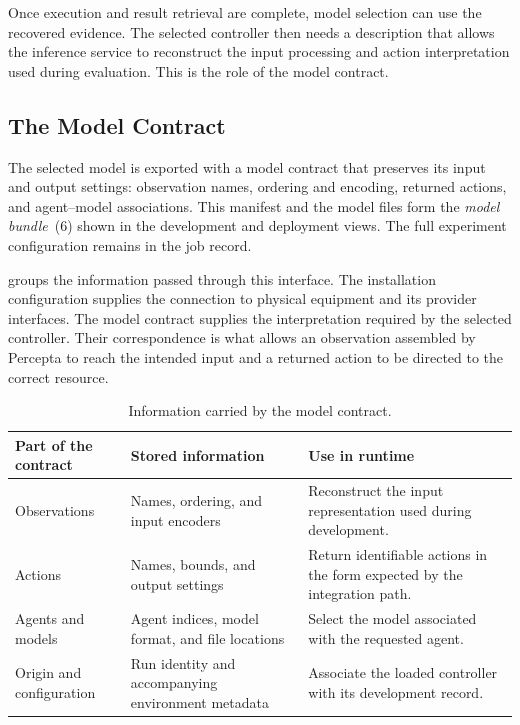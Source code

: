 Once execution and result retrieval are complete, model selection can use the recovered evidence. The selected controller then needs a description that allows the inference service to reconstruct the input processing and action interpretation used during evaluation. This is the role of the model contract.

\subsection{The Model Contract}
\label{sec:energaize-contract}

The selected model is exported with a model contract that preserves its input and output settings: observation names, ordering and encoding, returned actions, and agent--model associations. This manifest and the model files form the \emph{model bundle}~(6) shown in the development and deployment views. The full experiment configuration remains in the job record.

 groups the information passed through this interface. The installation configuration supplies the connection to physical equipment and its provider interfaces. The model contract supplies the interpretation required by the selected controller. Their correspondence is what allows an observation assembled by Percepta to reach the intended input and a returned action to be directed to the correct resource.

\begin{table}[htbp]
\centering
\caption{Information carried by the model contract.}
\label{tab:energaize-model-contract}
\small
\renewcommand{\arraystretch}{1.12}
\begin{tabularx}{\textwidth}{@{}>{\raggedright\arraybackslash}p{}>{\raggedright\arraybackslash}X>{\raggedright\arraybackslash}X@{}}
\toprule
\textbf{Part of the contract} & \textbf{Stored information} & \textbf{Use in runtime} \\
\midrule
Observations & Names, ordering, and input encoders & Reconstruct the input representation used during development. \\
Actions & Names, bounds, and output settings & Return identifiable actions in the form expected by the integration path. \\
Agents and models & Agent indices, model format, and file locations & Select the model associated with the requested agent. \\
Origin and configuration & Run identity and accompanying environment metadata & Associate the loaded controller with its development record. \\
\bottomrule
\end{tabularx}
\end{table}

